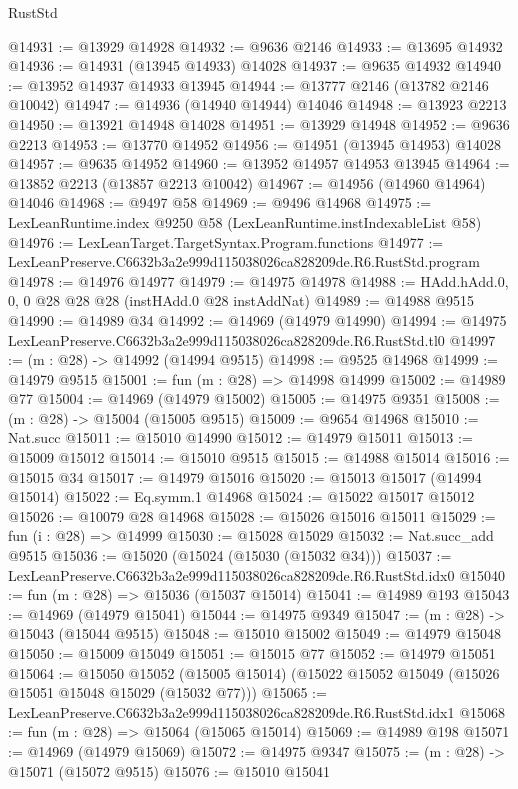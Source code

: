 \begin{lexlean}{RustStd}
\begin{coremodule}
@14931 := @13929 @14928
@14932 := @9636 @2146
@14933 := @13695 @14932
@14936 := @14931 (@13945 @14933) @14028
@14937 := @9635 @14932
@14940 := @13952 @14937 @14933 @13945
@14944 := @13777 @2146 (@13782 @2146 @10042)
@14947 := @14936 (@14940 @14944) @14046
@14948 := @13923 @2213
@14950 := @13921 @14948 @14028
@14951 := @13929 @14948
@14952 := @9636 @2213
@14953 := @13770 @14952
@14956 := @14951 (@13945 @14953) @14028
@14957 := @9635 @14952
@14960 := @13952 @14957 @14953 @13945
@14964 := @13852 @2213 (@13857 @2213 @10042)
@14967 := @14956 (@14960 @14964) @14046
@14968 := @9497 @58
@14969 := @9496 @14968
@14975 := LexLeanRuntime.index @9250 @58 (LexLeanRuntime.instIndexableList @58)
@14976 := LexLeanTarget.TargetSyntax.Program.functions
@14977 := LexLeanPreserve.C6632b3a2e999d115038026ca828209de.R6.RustStd.program
@14978 := @14976 @14977
@14979 := @14975 @14978
@14988 := HAdd.hAdd.{0, 0, 0} @28 @28 @28 (instHAdd.{0} @28 instAddNat)
@14989 := @14988 @9515
@14990 := @14989 @34
@14992 := @14969 (@14979 @14990)
@14994 := @14975 LexLeanPreserve.C6632b3a2e999d115038026ca828209de.R6.RustStd.tl0
@14997 := (m : @28) -> @14992 (@14994 @9515)
@14998 := @9525 @14968
@14999 := @14979 @9515
@15001 := fun (m : @28) => @14998 @14999
@15002 := @14989 @77
@15004 := @14969 (@14979 @15002)
@15005 := @14975 @9351
@15008 := (m : @28) -> @15004 (@15005 @9515)
@15009 := @9654 @14968
@15010 := Nat.succ
@15011 := @15010 @14990
@15012 := @14979 @15011
@15013 := @15009 @15012
@15014 := @15010 @9515
@15015 := @14988 @15014
@15016 := @15015 @34
@15017 := @14979 @15016
@15020 := @15013 @15017 (@14994 @15014)
@15022 := Eq.symm.{1} @14968
@15024 := @15022 @15017 @15012
@15026 := @10079 @28 @14968
@15028 := @15026 @15016 @15011
@15029 := fun (i : @28) => @14999
@15030 := @15028 @15029
@15032 := Nat.succ_add @9515
@15036 := @15020 (@15024 (@15030 (@15032 @34)))
@15037 := LexLeanPreserve.C6632b3a2e999d115038026ca828209de.R6.RustStd.idx0
@15040 := fun (m : @28) => @15036 (@15037 @15014)
@15041 := @14989 @193
@15043 := @14969 (@14979 @15041)
@15044 := @14975 @9349
@15047 := (m : @28) -> @15043 (@15044 @9515)
@15048 := @15010 @15002
@15049 := @14979 @15048
@15050 := @15009 @15049
@15051 := @15015 @77
@15052 := @14979 @15051
@15064 := @15050
    @15052
    (@15005 @15014)
    (@15022 @15052 @15049 (@15026 @15051 @15048 @15029 (@15032 @77)))
@15065 := LexLeanPreserve.C6632b3a2e999d115038026ca828209de.R6.RustStd.idx1
@15068 := fun (m : @28) => @15064 (@15065 @15014)
@15069 := @14989 @198
@15071 := @14969 (@14979 @15069)
@15072 := @14975 @9347
@15075 := (m : @28) -> @15071 (@15072 @9515)
@15076 := @15010 @15041

\end{coremodule}
\end{lexlean}
